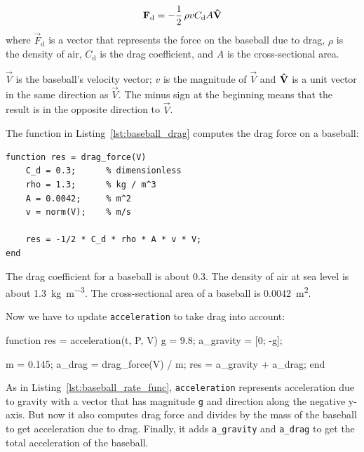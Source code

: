 \begin{equation*}
    \vec{F}_\mathrm{d} = - \frac{1}{2} \, \rho v C_\mathrm{d} A \uvec{V}
\end{equation*}
where $\vec{F}_\mathrm{d}$ is a vector that represents the force on the baseball
due to drag, 
$\rho$ is the density of air, 
$C_\mathrm{d}$ is the drag coefficient, and
$A$ is the cross-sectional area.


$\vec{V}$ is the baseball's velocity vector; $v$ is the magnitude of $\vec{V}$ and $\uvec{V}$ is a unit vector in the same direction as $\vec{V}$.  The minus sign at the beginning means that the result is in the opposite direction to $\vec{V}$.


The function in Listing~\ref{lst:baseball_drag} computes the drag force on a baseball:

\begin{lstlisting}[caption={A function that calculates the drag force on a baseball}, label={lst:baseball_drag}]
 function res = drag_force(V)
    C_d = 0.3;      % dimensionless
    rho = 1.3;      % kg / m^3
    A = 0.0042;     % m^2
    v = norm(V);    % m/s

    res = -1/2 * C_d * rho * A * v * V;
end
\end{lstlisting}
  
The drag coefficient for a baseball is about 0.3.  
The density of air at sea level is about \SI{1.3}{\kilogram\per\meter\cubed}.
The cross-sectional area of a baseball is \SI{0.0042}{\meter\squared}.


Now we have to update \lstinline{acceleration} to take drag into account:

\begin{code}
function res = acceleration(t, P, V)
    g = 9.8;                       %
    a_gravity = [0; -g];

    m = 0.145;                     %
    a_drag = drag_force(V) / m;
    res = a_gravity + a_drag;
end
\end{code}

As in Listing~\ref{lst:baseball_rate_func}, \lstinline{acceleration} represents acceleration due to gravity with a vector that has magnitude \lstinline{g} and direction along the negative y-axis.
But now it also computes drag force and divides by the mass of the baseball to get acceleration due to drag.
Finally, it adds \lstinline{a_gravity} and \lstinline{a_drag} to get the total acceleration of the baseball.


